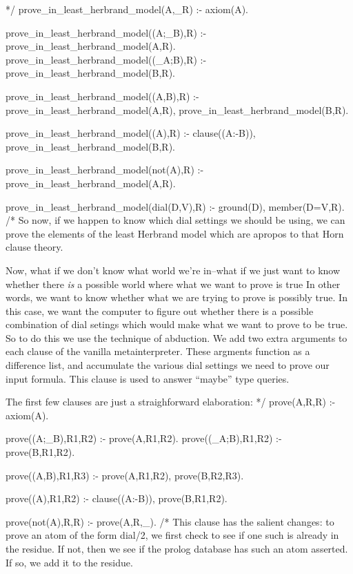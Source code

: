 \documentclass{book}[9pt]
\newenvironment{code}%
{\small \verbatim}%
{\endverbatim \large}
\begin{document}
\begin{code}
*/
prove_in_least_herbrand_model(A,_R) :- axiom(A).

prove_in_least_herbrand_model((A;_B),R) :-
        prove_in_least_herbrand_model(A,R).
prove_in_least_herbrand_model((_A;B),R) :-
        prove_in_least_herbrand_model(B,R).

prove_in_least_herbrand_model((A,B),R) :-
        prove_in_least_herbrand_model(A,R),
        prove_in_least_herbrand_model(B,R).

prove_in_least_herbrand_model((A),R) :-
        clause((A:-B)),
        prove_in_least_herbrand_model(B,R).

prove_in_least_herbrand_model(not(A),R) :-
        \+ prove_in_least_herbrand_model(A,R).
    
prove_in_least_herbrand_model(dial(D,V),R) :-
        ground(D),
        member(D=V,R).
/*
\end{code}
\noindent So now, if we happen to know which dial settings we should
be using, we can prove the elements of the least Herbrand model which
are apropos to that Horn clause theory.

Now, what if we don't know what world we're in--what if we just want
to know whether there {\em is} a possible world where what we want to
prove is true In other words, we want to know whether what we are
trying to prove is possibly true.  In this case, we want the computer
to figure out whether there is a possible combination of dial setings
which would make what we want to prove to be true.  So to do this we
use the technique of abduction.  We add two extra arguments to each
clause of the vanilla metainterpreter.  These argments function as a
difference list, and accumulate the various dial settings we need to
prove our input formula.  This clause is used to answer ``maybe'' type
queries.

The first few clauses are just a straighforward elaboration:
\begin{code}
*/
prove(A,R,R) :- axiom(A).

prove((A;_B),R1,R2) :-
        prove(A,R1,R2).
prove((_A;B),R1,R2) :-
        prove(B,R1,R2).

prove((A,B),R1,R3) :-
        prove(A,R1,R2),
        prove(B,R2,R3).

prove((A),R1,R2) :-
        clause((A:-B)),
        prove(B,R1,R2).

prove(not(A),R,R) :-
        \+ prove(A,R,_).
/*
\end{code}
\noindent This clause has the salient changes: to prove an atom of the
form dial/2, we first check to see if one such is already in the
residue.  If not, then we see if the prolog database has such an atom
asserted.  If so, we add it to the residue.  
\end{document}
